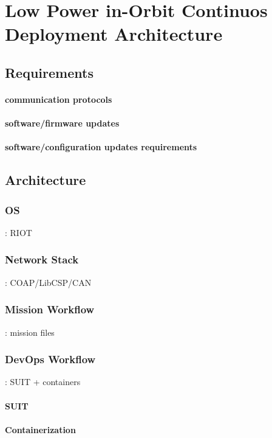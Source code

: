 \section{Low Power in-Orbit Continuos Deployment Architecture}
\label{sec:low-power-orbital-communicaiton-arch}

\subsection{Requirements}
\paragraph*{communication protocols}
\paragraph*{software/firmware updates}
\paragraph*{software/configuration updates requirements}

\subsection{Architecture}
\subsubsection{OS}: RIOT
\subsubsection{Network Stack}: COAP/LibCSP/CAN
\subsubsection{Mission Workflow}: mission files
\subsubsection{DevOps Workflow}: SUIT + containers
\paragraph*{SUIT}
\paragraph*{Containerization}

